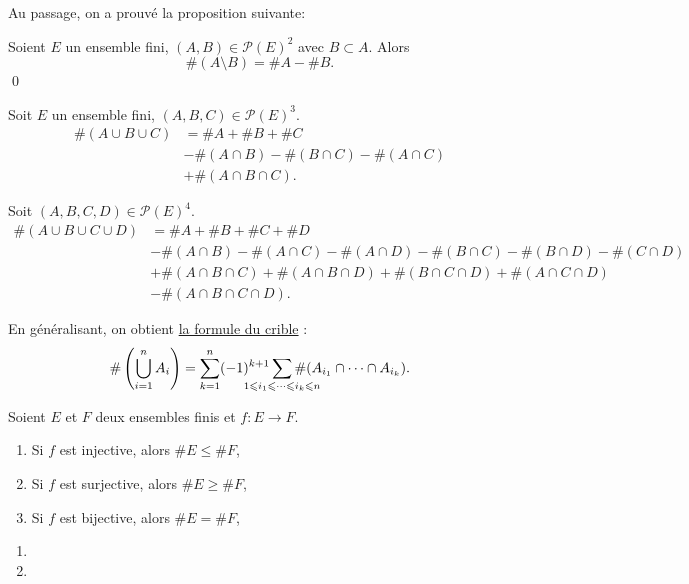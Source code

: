 \ifsimple\else
Au passage, on a prouvé la proposition suivante:
\fi

\begin{prop}
	Soient $E$ un ensemble fini, $(A,B) \in \mathcal{P}(E)^2$ avec $B \subset A$. Alors \[
		\#(A\setminus B) = \#A - \#B.
	\]\qed
\end{prop}

\begin{exm}
	Soit $E$ un ensemble fini, $(A,B,C) \in \mathcal{P}(E)^3$.
	\begin{align*}
		\#(A \cup B \cup C) &= \#A + \#B + \#C \\
		&-\#(A\cap B) - \#(B\cap C) - \#(A\cap C)\\
		&+\#(A\cap B\cap C).
	\end{align*}

	Soit $(A,B,C,D) \in \mathcal{P}(E)^4$.
	\begin{align*}
		\#(A\cup B\cup C\cup D) &= \#A + \#B + \#C + \#D \\
		&-\#(A\cap B) - \#(A\cap C) - \#(A\cap D) - \#(B\cap C) - \#(B\cap D) - \#(C\cap D)\\
		&+\#(A\cap B\cap C) + \#(A\cap B\cap D) + \#(B\cap C\cap D) + \#(A\cap C\cap D)\\
		&-\#(A\cap B\cap C\cap D).
	\end{align*}

	En généralisant, on obtient \underline{la formule du crible} :
	\[
		\#\left( \bigcup_{i=1} ^n A_i \right) = \sum_{k=1}^n (-1)^{k+1}\sum_{\mathclap{1\le i_1\le \cdots \le i_k \le n}} \#(A_{i_1} \cap \cdots \cap A_{i_k}).
	\]
\end{exm}

\begin{prop}
	Soient $E$ et $F$ deux ensembles finis et $f: E \to F$.
	\begin{enumerate}
		\item Si $f$ est injective, alors $\#E \le \#F$,
		\item Si $f$ est surjective, alors $\#E \ge \#F$,
		\item Si $f$ est bijective, alors $\#E = \#F$,
	\end{enumerate}
\end{prop}

\begin{prv}
	\begin{enumerate}
		\item
		\item
	\end{enumerate}
\end{prv}

